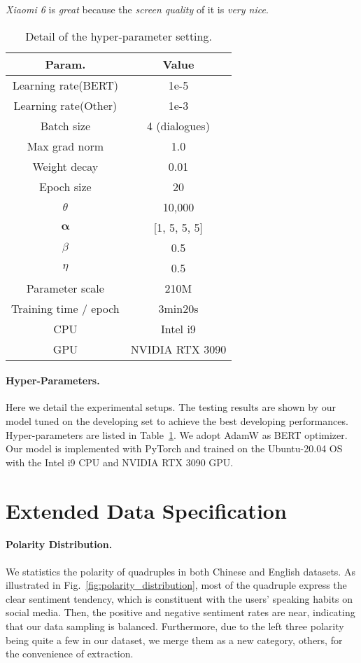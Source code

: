 \documentclass[11pt]{article}
\begin{document}
\textit{Xiaomi 6} is \textit{great} because the \textit{screen quality} of it is \textit{very nice}.

\begin{table}[!ht]
\fontsize{10}{11.5}\selectfont
  \centering
\begin{tabular}{cc} 
\hline
    Param. & Value\\
\hline
Learning rate(BERT) & 1e-5\\
Learning rate(Other) & 1e-3\\
Batch size & 4 (dialogues) \\
Max grad norm & 1.0 \\
Weight decay & 0.01 \\
Epoch size & 20 \\
$\theta$ & 10,000 \\
$\bm{\alpha}$  & [1, 5, 5, 5] \\
$\beta$ & 0.5 \\
$\eta$ & 0.5 \\
\hdashline
Parameter scale & 210M \\
Training time / epoch & 3min20s \\
\hdashline
CPU & Intel i9 \\
GPU & NVIDIA RTX 3090 \\
\hline  
\end{tabular}
\caption{Detail of the hyper-parameter setting.}
\label{table:hyper}
  \vspace{-10pt}
\end{table}

\paragraph{Hyper-Parameters.}
Here we detail the experimental setups.
The testing results are shown by our model tuned on the developing set to achieve the best developing performances.
Hyper-parameters are listed in Table~\ref{table:hyper}. 
We adopt AdamW as BERT optimizer. 
Our model is implemented with PyTorch and trained on the Ubuntu-20.04 OS with the Intel i9 CPU and NVIDIA RTX 3090 GPU. 

\section{Extended Data Specification}
\label{Extended Data Specification}

\paragraph{Polarity Distribution.}
We statistics the polarity of quadruples in both Chinese and English datasets.
As illustrated in Fig.~\ref{fig:polarity_distribution}, most of the quadruple express the clear sentiment tendency, which is constituent with the users’ speaking habits on social media.
Then, the positive and negative sentiment rates are near, indicating that our data sampling is balanced.
Furthermore, due to the left three polarity being quite a few in our dataset, we merge them as a new category, others, for the convenience of extraction.
\end{document}
